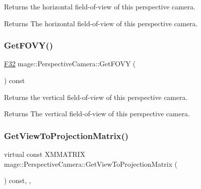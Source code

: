 Returns the horizontal field-\/of-\/view of this perspective camera.

\begin{DoxyReturn}{Returns}
The horizontal field-\/of-\/view of this perspective camera. 
\end{DoxyReturn}
\hypertarget{classmage_1_1_perspective_camera_a753f4479a5a13000864c297bc34c051f}{}\label{classmage_1_1_perspective_camera_a753f4479a5a13000864c297bc34c051f} 
\subsubsection{\texorpdfstring{Get\+F\+O\+V\+Y()}{GetFOVY()}}
{\footnotesize\ttfamily \hyperlink{namespacemage_aa97e833b45f06d60a0a9c4fc22ae02c0}{F32} mage\+::\+Perspective\+Camera\+::\+Get\+F\+O\+VY (\begin{DoxyParamCaption}{ }\end{DoxyParamCaption}) const\hspace{0.3cm}{\ttfamily [noexcept]}}

Returns the vertical field-\/of-\/view of this perspective camera.

\begin{DoxyReturn}{Returns}
The vertical field-\/of-\/view of this perspective camera. 
\end{DoxyReturn}
\hypertarget{classmage_1_1_perspective_camera_a5b733ac978a22dc58b04cf301899d575}{}\label{classmage_1_1_perspective_camera_a5b733ac978a22dc58b04cf301899d575} 
\subsubsection{\texorpdfstring{Get\+View\+To\+Projection\+Matrix()}{GetViewToProjectionMatrix()}}
{\footnotesize\ttfamily virtual const X\+M\+M\+A\+T\+R\+IX mage\+::\+Perspective\+Camera\+::\+Get\+View\+To\+Projection\+Matrix (\begin{DoxyParamCaption}{ }\end{DoxyParamCaption}) const\hspace{0.3cm}{\ttfamily [override]}, {\ttfamily [virtual]}, {\ttfamily [noexcept]}}

